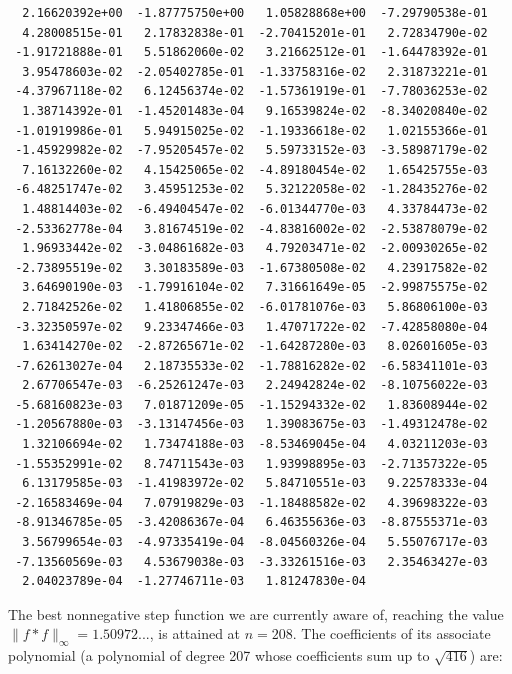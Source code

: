\documentclass[12pt]{amsart}
\theoremstyle{definition}
\begin{document}
{\footnotesize
\begin{verbatim}
  2.16620392e+00  -1.87775750e+00   1.05828868e+00  -7.29790538e-01
  4.28008515e-01   2.17832838e-01  -2.70415201e-01   2.72834790e-02
 -1.91721888e-01   5.51862060e-02   3.21662512e-01  -1.64478392e-01
  3.95478603e-02  -2.05402785e-01  -1.33758316e-02   2.31873221e-01
 -4.37967118e-02   6.12456374e-02  -1.57361919e-01  -7.78036253e-02
  1.38714392e-01  -1.45201483e-04   9.16539824e-02  -8.34020840e-02
 -1.01919986e-01   5.94915025e-02  -1.19336618e-02   1.02155366e-01
 -1.45929982e-02  -7.95205457e-02   5.59733152e-03  -3.58987179e-02
  7.16132260e-02   4.15425065e-02  -4.89180454e-02   1.65425755e-03
 -6.48251747e-02   3.45951253e-02   5.32122058e-02  -1.28435276e-02
  1.48814403e-02  -6.49404547e-02  -6.01344770e-03   4.33784473e-02
 -2.53362778e-04   3.81674519e-02  -4.83816002e-02  -2.53878079e-02
  1.96933442e-02  -3.04861682e-03   4.79203471e-02  -2.00930265e-02
 -2.73895519e-02   3.30183589e-03  -1.67380508e-02   4.23917582e-02
  3.64690190e-03  -1.79916104e-02   7.31661649e-05  -2.99875575e-02
  2.71842526e-02   1.41806855e-02  -6.01781076e-03   5.86806100e-03
 -3.32350597e-02   9.23347466e-03   1.47071722e-02  -7.42858080e-04
  1.63414270e-02  -2.87265671e-02  -1.64287280e-03   8.02601605e-03
 -7.62613027e-04   2.18735533e-02  -1.78816282e-02  -6.58341101e-03
  2.67706547e-03  -6.25261247e-03   2.24942824e-02  -8.10756022e-03
 -5.68160823e-03   7.01871209e-05  -1.15294332e-02   1.83608944e-02
 -1.20567880e-03  -3.13147456e-03   1.39083675e-03  -1.49312478e-02
  1.32106694e-02   1.73474188e-03  -8.53469045e-04   4.03211203e-03
 -1.55352991e-02   8.74711543e-03   1.93998895e-03  -2.71357322e-05
  6.13179585e-03  -1.41983972e-02   5.84710551e-03   9.22578333e-04
 -2.16583469e-04   7.07919829e-03  -1.18488582e-02   4.39698322e-03
 -8.91346785e-05  -3.42086367e-04   6.46355636e-03  -8.87555371e-03
  3.56799654e-03  -4.97335419e-04  -8.04560326e-04   5.55076717e-03
 -7.13560569e-03   4.53679038e-03  -3.33261516e-03   2.35463427e-03
  2.04023789e-04  -1.27746711e-03   1.81247830e-04
\end{verbatim}
}

\medskip

The best nonnegative step function we are currently aware of,
reaching the value $\| f \ast f\|_{\infty} = 1.50972...$, is
attained at $n = 208$. The coefficients of its associate
polynomial (a polynomial of degree 207 whose coefficients sum up
to $\sqrt{416}$) are:
\end{document}
